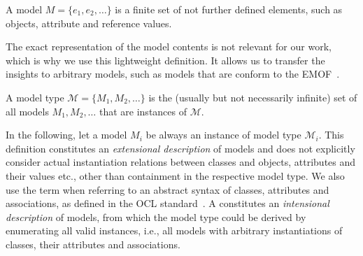 \begin{definition}[Model]
A model $M = \{e_1, e_2, \ldots\}$ is a finite set of not further defined elements, such as objects, attribute and reference values.
\end{definition}

The exact representation of the model contents is not relevant for our work, which is why we use this lightweight definition. 
It allows us to transfer the insights to arbitrary models, such as models that are conform to the \ac{EMOF}~\cite{mof}.

\begin{definition}
A model type $\mathcal{M} = \{M_1, M_2, \dots\}$ is the (usually but not necessarily infinite) set of all models $M_1, M_2, \dots$ that are instances of $\mathcal{M}$.
\end{definition}

In the following, let a model $M_i$ be always an instance of model type $\mathcal{M}_i$.
This definition constitutes an \emph{extensional description} of models and does not explicitly consider actual instantiation relations between classes and objects, attributes and their values etc., other than containment in the respective model type. 
We also use the term \emph{\metamodel} when referring to an abstract syntax of classes, attributes and associations, as defined in the OCL standard~\cite[A.1]{ocl}. 
A \metamodel constitutes an \emph{intensional description} of models, from which the model type could be derived by enumerating all valid instances, i.e., all models with arbitrary instantiations of classes, their attributes and associations.



